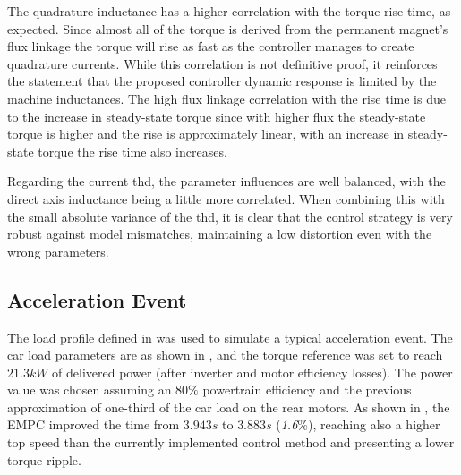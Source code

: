 The quadrature inductance has a higher correlation with the torque rise time, as expected. Since almost all of the torque is derived from the permanent magnet's flux linkage the torque will rise as fast as the controller manages to create quadrature currents. While this correlation is not definitive proof, it reinforces the statement that the proposed controller dynamic response is limited by the machine inductances. The high flux linkage correlation with the rise time is due to the increase in steady-state torque since with higher flux the steady-state torque is higher and the rise is approximately linear, with an increase in steady-state torque the rise time also increases.

Regarding the current \gls{thd}, the parameter influences are well balanced, with the direct axis inductance being a little more correlated. When combining this with the small absolute variance of the \gls{thd}, it is clear that the control strategy is very robust against model mismatches, maintaining a low distortion even with the wrong parameters.

\subsection{Acceleration Event}
\label{section:acceleration}%

The load profile defined in  was used to simulate a typical acceleration event. The car load parameters are as shown in , and the torque reference was set to reach $21.3kW$ of delivered power (after inverter and motor efficiency losses). The power value was chosen assuming an $80\%$ powertrain efficiency and the previous approximation of one-third of the car load on the rear motors. As shown in , the EMPC improved the time from $3.943s$ to $3.883s$ (\textit{1.6}\%), reaching also a higher top speed than the currently implemented control method and presenting a lower torque ripple.

